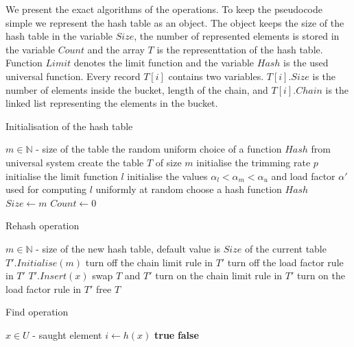 We present the exact algorithms of the operations. To keep the pseudocode simple we represent the hash table as an object. The object keeps the size of the hash table in the variable $Size$, the number of represented elements is stored in the variable $Count$ and the array $T$ is the representtation of the hash table. Function $Limit$ denotes the limit function and the variable $Hash$ is the used universal function. Every record $T[i]$ contains two variables. $T[i].Size$ is the number of elements inside the bucket, length of the chain, and $T[i].Chain$ is the linked list representing the elements in the bucket.

\begin{algorithm}[H]
\caption{Initialisation of the hash table}
\label{algorithm-initialisation}
\begin{algorithmic}
\REQUIRE $m \in \mathbb{N}$ - size of the table
\STATE
\ENSURE the random uniform choice of a function $Hash$ from universal system
\STATE
\STATE create the table $T$ of size $m$
\STATE initialise the trimming rate $p$
\STATE initialise the limit function $l$
\STATE initialise the values $\alpha_l < \alpha_m < \alpha_u$ and load factor $\alpha'$ used for computing $l$
\STATE uniformly at random choose a hash function $Hash$
\STATE $Size \leftarrow m$
\STATE $Count \leftarrow 0$
\end{algorithmic}
\end{algorithm}

\begin{algorithm}[H]
\caption{Rehash operation}
\label{algorithm-rehash}
\begin{algorithmic}
\REQUIRE $m \in \mathbb{N}$ - size of the new hash table, default value is $Size$ of the current table
\STATE
\REPEAT
	\STATE $T'.Initialise(m)$
	\STATE turn off the chain limit rule in $T'$
	\STATE turn off the load factor rule in $T'$
		\STATE $T'.Insert(x)$
	\ENDFOR
{}
\STATE
\STATE swap $T$ and $T'$
\STATE turn on the chain limit rule in $T'$
\STATE turn on the load factor rule in $T'$
\STATE free $T$
\end{algorithmic}
\end{algorithm}

\begin{algorithm}[H]
\caption{Find operation}
\label{algorithm-find}
\begin{algorithmic}
\REQUIRE $x \in U$ - saught element
\STATE
$i \leftarrow h(x)$
	\RETURN \textbf{true} 
\ELSE
	\RETURN \textbf{false} 
\ENDIF
\end{algorithmic}
\end{algorithm}

